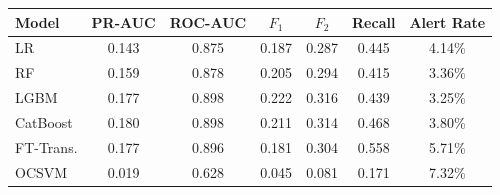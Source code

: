\begin{tabular}{l c c c c c c}
\toprule
Model & PR-AUC & ROC-AUC & $F_1$ & $F_2$ & Recall & Alert Rate \\
\midrule
LR         & 0.143 & 0.875 & 0.187 & 0.287 & 0.445 & 4.14\% \\
RF         & 0.159 & 0.878 & 0.205 & 0.294 & 0.415 & 3.36\% \\
LGBM       & 0.177 & 0.898 & 0.222 & 0.316 & 0.439 & 3.25\% \\
CatBoost   & 0.180 & 0.898 & 0.211 & 0.314 & 0.468 & 3.80\% \\
FT-Trans.  & 0.177 & 0.896 & 0.181 & 0.304 & 0.558 & 5.71\% \\
OCSVM      & 0.019 & 0.628 & 0.045 & 0.081 & 0.171 & 7.32\% \\
\bottomrule
\end{tabular}
